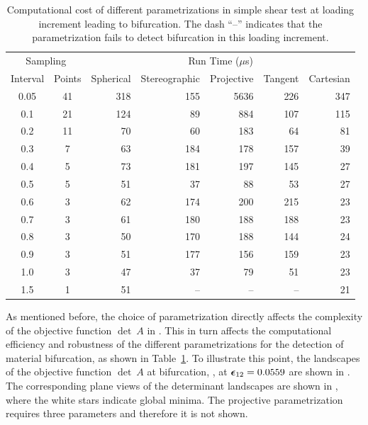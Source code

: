 \documentclass[12pt]{article}
\numberwithin{equation}{section}
\begin{document}
\begin{table}[!htbp]
  \begin{center}
    \begin{tabular}{c c | r r r r r}
      \toprule
      \multicolumn{2}{c}{Sampling} & \multicolumn{5}{c}{Run Time ($\mu$s)} \\
      Interval & Points & Spherical & Stereographic & Projective &
      Tangent & Cartesian \\
      \midrule
      0.05 & 41 & 318 & 155 & 5636 & 226 & 347  \\
      0.1 & 21 & 124 & 89  & 884 & 107 & 115  \\
      0.2 & 11 & 70 & 60  & 183 & 64  & 81  \\
      0.3 & 7 & 63 & 184 & 178 & 157 & 39  \\
      0.4 & 5 & 73 & 181 & 197 & 145 & 27  \\
      0.5 & 5 & 51 & 37  & 88  & 53  & 27  \\
      0.6 & 3 & 62 & 174 & 200 & 215 & 23  \\
      0.7 & 3 & 61 & 180 & 188 & 188 & 23  \\
      0.8 & 3 & 50 & 170 & 188 & 144 & 24  \\
      0.9 & 3 & 51 & 177 & 156 & 159 & 23  \\
      1.0 & 3 & 47 & 37  & 79  & 51  & 23  \\
      1.5 & 1 & 51 & -- & --  & -- & 21  \\
      \bottomrule
    \end{tabular}
    \caption{Computational cost of different parametrizations in
      simple shear test at loading increment leading to bifurcation.
      The dash ``--'' indicates that the parametrization fails to
      detect bifurcation in this loading increment.}
    \label{tab:iso-shear-runtime}
  \end{center}
\end{table}

As mentioned before, the choice of parametrization directly affects
the complexity of the objective function $\det~A$ in
. This in turn affects the
computational efficiency and robustness of the different
parametrizations for the detection of material bifurcation, as shown
in Table~\ref{tab:iso-shear-runtime}. To illustrate this point, the
landscapes of the objective function $\det~A$ at bifurcation, \ie, at
${\boldsymbol{\epsilon}}_{12}=0.0559$ are shown in . The
corresponding plane views of the determinant landscapes are shown in
, where the white stars indicate global
minima. The projective parametrization requires three parameters and
therefore it is not shown.
\end{document}
